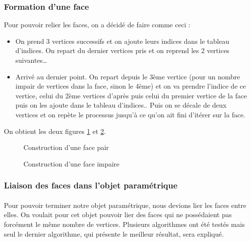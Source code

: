 \documentclass[article, backcover, french, nodocumentinfo]{upmethodology-document}
\begin{document}
	\subsubsection{Formation d'une face}
	Pour pouvoir relier les faces, on a décidé de faire comme ceci : 
	\begin{itemize}
		\item On prend 3 vertices successifs et on ajoute leurs indices dans le tableau d'indices. On repart du dernier vertices pris et on reprend les 2 vertices suivantes\ldots
		\item Arrivé au dernier point. On repart depuis le 3ème vertice (pour un nombre impair de vertices dans la face, sinon le 4ème) et on va prendre l'indice de ce vertice, celui du 2ème vertices d'après puis celui du premier vertice de la face puis on les ajoute dans le tableau d'indices.. Puis on se décale de deux vertices et on repète le processus jusqu'à ce qu'on ait fini d'itérer sur la face.
	\end{itemize}
	On obtient les deux figures \ref{fig:face_1} et \ref{fig:face_2}.
	\begin{figure}[H]
			\centering%
			\caption{Construction d'une face pair}%
			\label{fig:face_1}%
	\end{figure}
	\begin{figure}[H]
			\centering%
			\caption{Construction d'une face impaire}%
			\label{fig:face_2}%
	\end{figure}
	\subsubsection{Liaison des faces dans l'objet paramétrique}
		\paragraph{} Pour pouvoir terminer notre objet paramétrique, nous devions lier les faces entre elles. On voulait pour cet objet pouvoir lier des faces qui ne possédaient pas forcément le même nombre de vertices. Plusieurs algorithmes ont été testés mais seul le dernier algorithme, qui présente le meilleur résultat, sera expliqué.
		
\end{document}
